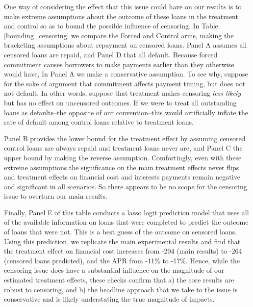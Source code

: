 One way of considering the effect that this issue could have on our results is to make extreme assumptions about the outcome of these loans in the treatment and control so as to bound the possible influence of censoring.  In Table \ref{bounding_censoring} we compare the Forced and Control arms, making the bracketing assumptions about repayment on censored loans.  Panel A assumes all censored loans are repaid, and Panel D that all default. Because forced commitment causes borrowers to make payments earlier than they otherwise would have, In Panel A we make a conservative assumption. To see why, suppose for the sake of argument that commitment affects payment timing, but does not not default.
In other words, suppose that treatment makes censoring \emph{less likely} but has no effect on uncensored outcomes. 
If we were to treat all outstanding loans as defaults--the opposite of our convention--this would artificially inflate the rate of default among control loans relative to treatment loans.

Panel B provides the lower bound for the treatment effect by assuming censored control loans are always repaid and treatment loans never are, and Panel C the upper bound by making the reverse assumption.  Comfortingly, even with these extreme assumptions the significance on the main treatment effects never flips and treatment effects on financial cost and interests payments remain negative and significant in all scenarios.  So there appears to be no scope for the censoring issue to overturn our main results. 



Finally, Panel E of this table conducts a lasso logit prediction model that uses all of the available information on loans that were completed to predict the outcome of loans that were not.  This is a best guess of the outcome on censored loans.  Using this prediction, we replicate the main experimental results and find that the treatment effect on financial cost increases from -204 (main results) to -264 (censored loans predicted), and the APR from -11\% to -17\%.  Hence, while the censoring issue does have a substantial influence on the magnitude of our estimated treatment effects, these  checks confirm that a) the core results are robust to censoring, and b) the headline approach that we take to the issue is conservative and is likely understating the true magnitude of impacts.

